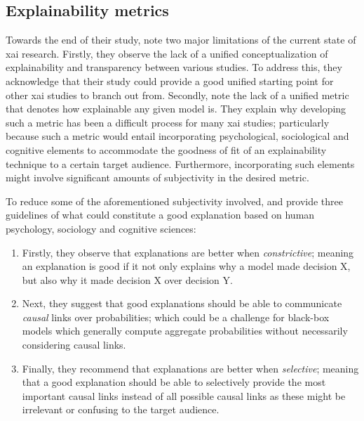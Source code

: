 \subsection{Explainability metrics}

\label{section:xai_metrics}

Towards the end of their study, \citet{arrieta2020explainable} note two major
limitations of the current state of \ac{xai} research. Firstly, they observe the lack
of a unified conceptualization of explainability and transparency between
various studies. To address this, they acknowledge that their study could
provide a good unified starting point for other \ac{xai} studies to branch out from.
Secondly, \citet{arrieta2020explainable} note the lack of a unified metric that
denotes how explainable any given model is. They explain why developing
such a metric has been a difficult process for many \ac{xai} studies; particularly
because such a metric would entail incorporating psychological, sociological and
cognitive elements to accommodate the goodness of fit of an explainability
technique to a certain target audience. Furthermore, incorporating such elements
might involve significant amounts of subjectivity in the desired metric.

To reduce some of the aforementioned subjectivity involved, \citet{MILLER20191}
and \citet{arrieta2020explainable} provide three guidelines of what could
constitute a good explanation based on human psychology, sociology and cognitive
sciences:

\begin{enumerate}
  \item Firstly, they observe that explanations are better when
  \textit{constrictive}; meaning an explanation is good if it not only explains
  why a model made decision X, but also why it made decision X over decision Y.

  \item Next, they suggest that good explanations should be able to communicate
  \textit{causal} links over probabilities; which could be a challenge for black-box
  models which generally compute aggregate probabilities without necessarily
  considering causal links.

  \item Finally, they recommend that explanations are better when
  \textit{selective}; meaning that a good explanation should be able to
  selectively provide the most important causal links instead of all possible
  causal links as these might be irrelevant or confusing to the target audience.
\end{enumerate}

